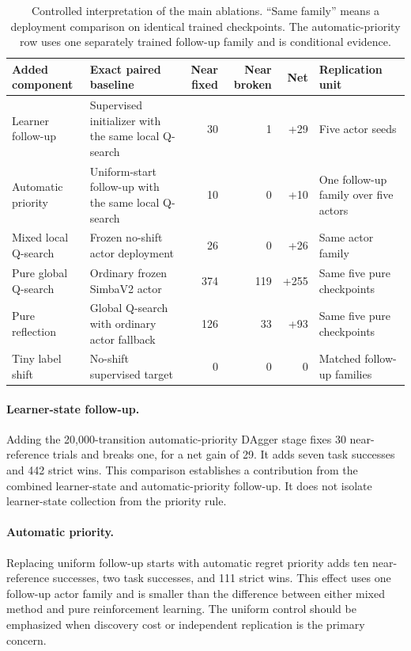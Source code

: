 \documentclass[10pt,twocolumn]{article}
\begin{document}
\begin{table}[t]
\centering
\caption{Controlled interpretation of the main ablations. ``Same family'' means a deployment comparison on identical trained checkpoints. The automatic-priority row uses one separately trained follow-up family and is conditional evidence.}
\label{tab:ablations}
\footnotesize
\begin{tabularx}{\textwidth}{>{\raggedright\arraybackslash}p{34mm}>{\raggedright\arraybackslash}Xrrr>{\raggedright\arraybackslash}p{34mm}}
\toprule
Added component & Exact paired baseline & Near fixed & Near broken & Net & Replication unit\\
\midrule
Learner follow-up & Supervised initializer with the same local Q-search & 30 & 1 & +29 & Five actor seeds\\
Automatic priority & Uniform-start follow-up with the same local Q-search & 10 & 0 & +10 & One follow-up family over five actors\\
Mixed local Q-search & Frozen no-shift actor deployment & 26 & 0 & +26 & Same actor family\\
Pure global Q-search & Ordinary frozen SimbaV2 actor & 374 & 119 & +255 & Same five pure checkpoints\\
Pure reflection & Global Q-search with ordinary actor fallback & 126 & 33 & +93 & Same five pure checkpoints\\
Tiny label shift & No-shift supervised target & 0 & 0 & 0 & Matched follow-up families\\
\bottomrule
\end{tabularx}
\end{table}

\paragraph{Learner-state follow-up.}
Adding the 20,000-transition automatic-priority DAgger stage fixes 30 near-reference trials and breaks one, for a net gain of 29. It adds seven task successes and 442 strict wins. This comparison establishes a contribution from the combined learner-state and automatic-priority follow-up. It does not isolate learner-state collection from the priority rule.

\paragraph{Automatic priority.}
Replacing uniform follow-up starts with automatic regret priority adds ten near-reference successes, two task successes, and 111 strict wins. This effect uses one follow-up actor family and is smaller than the difference between either mixed method and pure reinforcement learning. The uniform control should be emphasized when discovery cost or independent replication is the primary concern.
\end{document}
